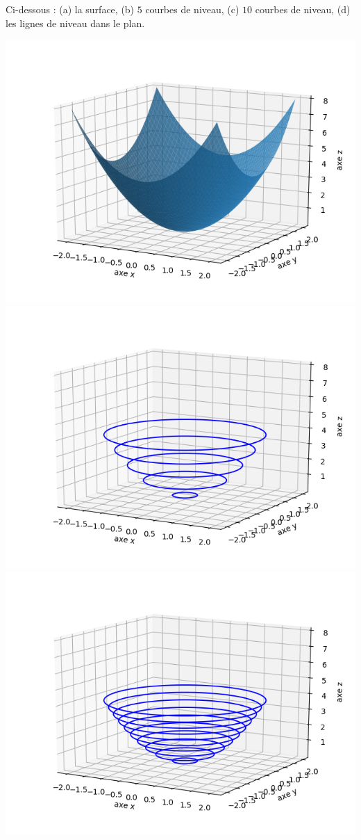 \begin{exemple}{}{}
	Ci-dessous : (a) la surface, (b) $5$ courbes de niveau, (c) $10$ courbes de niveau, (d) les lignes de niveau dans le plan.
	\begin{center}
		\includegraphics[scale=\myscale,scale=0.5]{figures/fonctions-niveau-1a}
		\includegraphics[scale=\myscale,scale=0.5]{figures/fonctions-niveau-1b}
		\includegraphics[scale=\myscale,scale=0.5]{figures/fonctions-niveau-1c}

\end{center}
\end{exemple}
